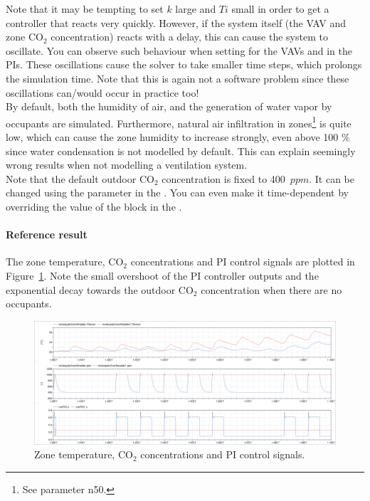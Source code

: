 \documentclass[10pt,a4paper]{article}
\begin{document}
Note that it may be tempting to set $k$ large and $Ti$ small
in order to get a controller that reacts very quickly. However,
if the system itself (the VAV and zone CO$_2$ concentration)
reacts with a delay, this can cause the system to oscillate.
You  can observe such behaviour when setting  for the VAVs and
 in the PIs.
These oscillations cause the solver to take smaller time steps, 
which prolongs the simulation time.
Note that this is again not a software problem since these oscillations can/would occur 
in practice too!\\

By default, both the humidity of air, and the generation of water
vapor by occupants are simulated.
Furthermore, natural air infiltration in zones\footnote{See parameter n50.} is quite low, 
which can cause the zone humidity to increase strongly, 
even above 100 \% since water condensation
is not modelled by default.
This can explain seemingly wrong results when not modelling
a ventilation system.\\

Note that the default outdoor CO$_2$ concentration is fixed to 400~$ppm$.
It can be changed using the parameter  in the 
. You can even make it time-dependent
by overriding the value of the  block 
in the .

\newpage

\paragraph{Reference result}
The zone temperature, CO$_2$ concentrations and 
PI control signals are plotted in Figure~\ref{fig:res4}.
Note the small overshoot of the PI controller outputs
and the exponential decay towards the outdoor CO$_2$
concentration when there are no occupants.

\begin{figure}[h!]
\centering
\includegraphics[width=\linewidth]{Example9.png}
\caption{Zone temperature, CO$_2$ concentrations and PI control signals.}
\label{fig:res4}
\end{figure}
\end{document}
